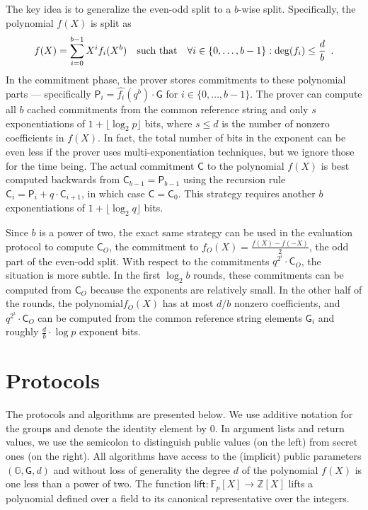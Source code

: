 \documentclass[11pt]{article}
\theoremstyle{Definition}
\begin{document}
The key idea is to generalize the even-odd split to a $b$-wise split. Specifically, the polynomial $f(X)$ is split as
\begin{equation}
f(X) = \sum_{i=0}^{b-1} X^i f_i(X^b) \quad \textnormal{such that} \quad \forall i \in \{0,\ldots,b-1\} : \textnormal{deg}(f_i) \leq \frac{d}{b} \enspace .
\end{equation}
In the commitment phase, the prover stores commitments to these polynomial parts --- specifically $\mathsf{P}_i = \hat{f_i}(q^b) \cdot \mathsf{G}$ for $i \in \{0, \ldots, b-1\}$. The prover can compute all $b$ cached commitments from the common reference string and only $s$ exponentiations of $1+\lfloor\log_2 p\rfloor$ bits, where $s \leq d$ is the number of nonzero coefficients in $f(X)$. In fact, the total number of bits in the exponent can be even less if the prover uses multi-exponentiation techniques, but we ignore those for the time being. The actual commitment $\mathsf{C}$ to the polynomial $f(X)$ is best computed backwards from $\mathsf{C}_{b-1} = \mathsf{P}_{b-1}$ using the recursion rule $\mathsf{C}_{i} = \mathsf{P}_i + q \cdot \mathsf{C}_{i+1}$, in which case $\mathsf{C} = \mathsf{C}_0$. This strategy requires another $b$ exponentiations of $1 + \lfloor \log_2 q \rfloor$ bits.

Since $b$ is a power of two, the exact same strategy can be used in the evaluation protocol to compute $\mathsf{C}_O$, the commitment to $f_O(X) = \frac{f(X) - f(-X)}{2}$, the odd part of the even-odd split. With respect to the commitments $q^{2^i} \cdot \mathsf{C}_O$, the situation is more subtle. In the first $\log_2 b$ rounds, these commitments can be computed from $\mathsf{C}_O$ because the exponents are relatively small. In the other half of the rounds, the polynomial$f_O(X)$ has at most $d/b$ nonzero coefficients, and $q^{2^i} \cdot \mathsf{C}_O$ can be computed from the common reference string elements $\mathsf{G}_i$ and roughly $\frac{d}{b} \cdot \log p$ exponent bits.

\section{Protocols}

The protocols and algorithms are presented below. We use additive notation for the groups and denote the identity element by 0. In argument lists and return values, we use the semicolon to distinguish public values (on the left) from secret ones (on the right). All algorithms have access to the (implicit) public parameters $(\mathbb{G}, \mathsf{G}, d)$ and without loss of generality the degree $d$ of the polynomial $f(X)$ is one less than a power of two. The function $\mathsf{lift} : \mathbb{F}_p[X] \rightarrow \mathbb{Z}[X]$ lifts a polynomial defined over a field to its canonical representative over the integers.
\end{document}
